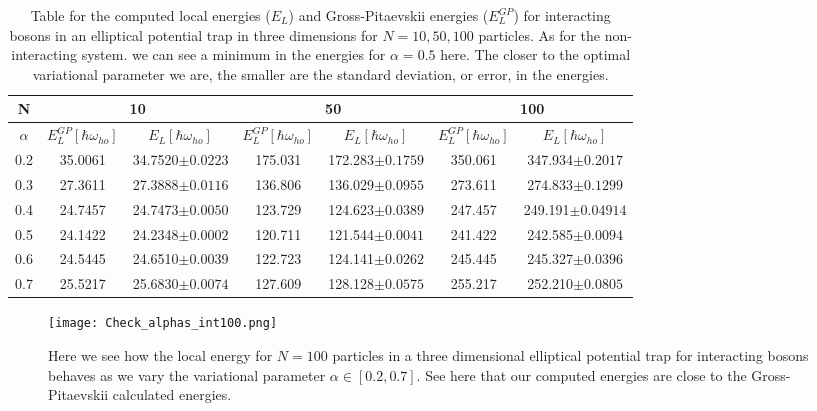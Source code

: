\documentclass[12pt,a4paper,english]{article}
\begin{document}
\begin{table}[htbp!]
	\hspace{-1.0cm}
	\begin{tabular}{ |c|c|c|c|c|c|c| }
		\hline \rule{0pt}{13pt}
		N & \multicolumn{2}{c|}{10} & \multicolumn{2}{c|}{50} & \multicolumn{2}{c|}{100}\\
		\hline \rule{0pt}{13pt}
		$\alpha$ & $E_L^{GP}[\hbar\omega_{ho}]$ & $E_L[\hbar\omega_{ho}]$ & $E_L^{GP}[\hbar\omega_{ho}]$ & $E_L[\hbar\omega_{ho}]$ & $E_L^{GP}[\hbar\omega_{ho}]$ & $E_L[\hbar\omega_{ho}]$ \\
		\hline \rule{0pt}{13pt}
		0.2 & 35.0061 & 34.7520$\pm0.0223$ & 175.031 & 172.283$\pm0.1759$ & 350.061 & 347.934$\pm0.2017$ \\
		\hline \rule{0pt}{13pt}
		0.3 & 27.3611 & 27.3888$\pm0.0116$ & 136.806 & 136.029$\pm0.0955$ & 273.611 & 274.833$\pm0.1299$ \\
		\hline \rule{0pt}{13pt}
		0.4 & 24.7457 & 24.7473$\pm0.0050$ & 123.729 & 124.623$\pm0.0389$ & 247.457 & 249.191$\pm0.04914$ \\
		\hline \rule{0pt}{13pt}
		0.5 & 24.1422 & 24.2348$\pm0.0002$ & 120.711 & 121.544$\pm0.0041$ & 241.422 & 242.585$\pm0.0094$ \\
		\hline \rule{0pt}{13pt}
		0.6 & 24.5445 & 24.6510$\pm0.0039$ & 122.723 & 124.141$\pm0.0262$ & 245.445 & 245.327$\pm0.0396$ \\
		\hline \rule{0pt}{13pt}
		0.7 & 25.5217 & 25.6830$\pm0.0074$ & 127.609 & 128.128$\pm0.0575$ & 255.217 & 252.210$\pm0.0805$ \\
		\hline
	\end{tabular}	
	\caption{Table for the computed local energies ($E_L$) and Gross-Pitaevskii energies ($E_L^{GP}$) for interacting bosons in an elliptical potential trap in three dimensions for $N=10,50,100$ particles. As for the non-interacting system. we can see a minimum in the energies for $\alpha=0.5$ here. The closer to the optimal variational parameter we are, the smaller are the standard deviation, or error, in the energies.  \label{tab:alpha_int}}
\end{table}

\begin{figure}[htbp!]
	\centering\texttt{[image: Check\_alphas\_int100.png]}
	\caption{Here we see how the local energy for $N=100$ particles in a three dimensional elliptical potential trap for interacting bosons behaves as we vary the variational parameter $\alpha\in[0.2,0.7]$. See here that our computed energies are close to the Gross-Pitaevskii calculated energies. \label{fig:check_int_alpha}}
\end{figure} 
\end{document}
